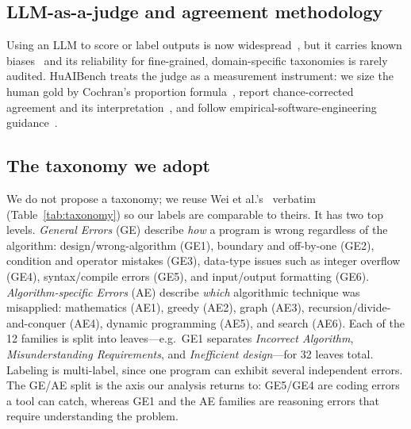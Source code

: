 \documentclass[conference]{IEEEtran}
\begin{document}
\subsection{LLM-as-a-judge and agreement methodology}
Using an LLM to score or label outputs is now
widespread~\cite{zheng2023judging,liu2023geval}, but it carries known
biases~\cite{wang2023fair} and its reliability for fine-grained, domain-specific
taxonomies is rarely audited. HuAIBench treats the judge as a measurement instrument: we
size the human gold by Cochran's proportion
formula~\cite{cochran1977sampling,krejcie1970determining}, report chance-corrected
agreement and its interpretation~\cite{cohen1960kappa,landis1977measurement,mchugh2012kappa,artstein2008agreement,krippendorff2018content},
and follow empirical-software-engineering
guidance~\cite{runeson2009guidelines,wohlin2012experimentation}.

\subsection{The taxonomy we adopt}
\label{sec:taxonomy}
We do not propose a taxonomy; we reuse Wei et al.'s~\cite{wei2026evaluating} verbatim
(Table~\ref{tab:taxonomy}) so our labels are comparable to theirs. It has two top
levels. \emph{General Errors} (GE) describe \emph{how} a program is wrong regardless
of the algorithm: design/wrong-algorithm (GE1), boundary and off-by-one (GE2),
condition and operator mistakes (GE3), data-type issues such as integer overflow
(GE4), syntax/compile errors (GE5), and input/output formatting (GE6).
\emph{Algorithm-specific Errors} (AE) describe \emph{which} algorithmic technique was
misapplied: mathematics (AE1), greedy (AE2), graph (AE3), recursion/divide-and-conquer
(AE4), dynamic programming (AE5), and search (AE6). Each of the 12 families is split
into leaves---e.g.\ GE1 separates \emph{Incorrect Algorithm}, \emph{Misunderstanding
Requirements}, and \emph{Inefficient design}---for 32 leaves total. Labeling is
multi-label, since one program can exhibit several independent errors. The GE/AE
split is the axis our analysis returns to: GE5/GE4 are coding errors a tool can catch,
whereas GE1 and the AE families are reasoning errors that require understanding the
problem.
\end{document}

